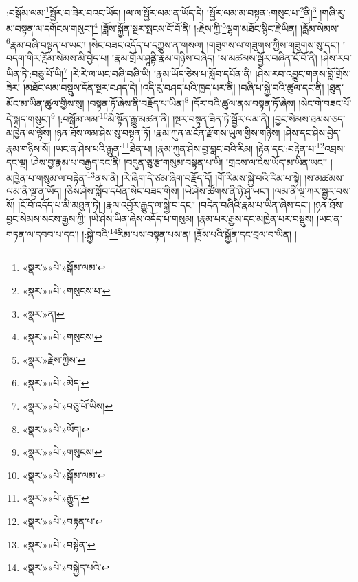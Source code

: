:བསྒོམ་ལམ་\footnote{«སྣར་»«པེ་»སྒོམ་ལམ་}སྦྱོར་བ་ཟེར་བའང་ཡོད། །ལ་ལ་སྦྱོར་ལམ་ན་ཡོད་དེ། །སྦྱོར་ལམ་མ་བསྟན་:གསུང་པ་\footnote{«སྣར་»«པེ་»གསུངས་པ་}ནི།\footnote{«སྣར་»ན།} །གཞི་རུ་མ་བསྟན་ལ་དགོངས་གསུང་།\footnote{«སྣར་»«པེ་»གསུངས།} །ཟློས་སྐྱོན་སྔར་སྤངས་ངོ་བོ་ནི། །:རྗེས་ཀྱི་\footnote{«སྣར་»རྗེས་ཀྱིས་}ལྷག་མཐོང་སྙིང་རྗེ་ཡིན། །རློམ་སེམས་\footnote{«སྣར་»«པེ་»མེད་}རྣམ་བཞི་བསྟན་པ་ཡང་། །སེང་བཟང་འདོད་པ་དཀྱུས་ན་གསལ། །གཟུགས་ལ་གཟུགས་ཀྱིས་གཟུགས་སུ་དང་། །བདག་གིར་རློམ་སེམས་མི་བྱེད་པ། །རྣམ་གྲོལ་ཤཱནྟི་རྣམ་གཉིས་བཞེད། །ས་མཚམས་སྦྱོར་བཞིན་ངོ་བོ་ནི། །ཤེས་རབ་ཡིན་ཏེ་:བཅུ་པོ་ཡི།\footnote{«སྣར་»«པེ་»བཅུ་པོ་ཡིས།} །རེ་རེ་ལ་ཡང་བཞི་བཞི་ཡི། །རྣམ་ཡོད་ཅེས་པ་སློབ་དཔོན་ནི། །ཤེས་རབ་འབྱུང་གནས་བློ་གྲོས་ཟེར། །མཐོང་ལམ་བསྡུས་དོན་སྔར་བཤད་དེ། །འདི་རུ་བཤད་པའི་ཁྱད་པར་ནི། །བཞི་པ་སྐྱེ་བའི་ཚུལ་དང་ནི། །ཐུན་མོང་མ་ཡིན་ཚུལ་གྱིས་སུ། །བསྟན་ཏོ་ཞེས་ནི་བརྗོད་པ་ཡིན།\footnote{«སྣར་»«པེ་»ཡོད།} །དོར་བའི་ཚུལ་ནས་བསྟན་ཏོ་ཞེས། །སེང་གེ་བཟང་པོ་དེ་སྐད་གསུང་།\footnote{«སྣར་»«པེ་»གསུངས།} །:བསྒོམ་ལམ་\footnote{«སྣར་»«པེ་»སྒོམ་ལམ་}མི་སྟོན་རྒྱུ་མཚན་ནི། །སྔར་བསྟན་ཟིན་ཏེ་སྦྱོར་ལམ་ནི། །བྱང་སེམས་ཐམས་ཅད་མཁྱེན་ལ་ལྟོས། །ཉན་ཐོས་ལམ་ཤེས་སུ་བསྟན་ཏོ། །རྣམ་ཀུན་མངོན་རྫོགས་ཡུལ་གྱིས་གཉིས། །ཤེས་དང་ཤེས་བྱེད་རྣམ་གཉིས་སོ། །ཡང་ན་ཤེས་པའི་རྒྱུན་\footnote{«སྣར་»«པེ་»རྒྱུད་}ཐེན་པ། །རྣམ་ཀུན་ཤེས་བྱ་བླང་བའི་རིམ། །རྟེན་དང་:བརྟེན་པ་\footnote{«སྣར་»«པེ་»བརྟན་པ་}འབྲས་དང་ལྔ། །ཤེས་བྱ་རྣམ་པ་བརྒྱད་དང་ནི། །བདུན་ཅུ་རྩ་གསུམ་བསྟན་པ་ཡི། །གྲངས་ལ་ངེས་ཡོད་མ་ཡིན་ཡང་། །མཁྱེན་པ་གསུམ་ལ་བརྟེན་\footnote{«སྣར་»«པེ་»བསྟེན་}ནས་ནི། །རེ་ཞིག་དེ་ཙམ་ཞིག་བརྗོད་དོ། །གོ་རིམས་སྐྱེ་བའི་རིམ་པ་སྟེ། །ས་མཚམས་ལམ་ནི་ལྔ་ན་ཡོད། །ཅིས་ཤེས་སློབ་དཔོན་སེང་བཟང་གིས། །ཡེ་ཤེས་ཚོགས་ནི་ཉི་ཤུ་ཡང་། །ལམ་ནི་ལྔ་ཀར་སྦྱར་བས་སོ། །ངོ་བོ་འདོད་པ་མི་མཐུན་ཏེ། །རྣལ་འབྱོར་རྒྱུད་ལ་སྐྱེ་བ་དང་། །བདེན་བཞིའི་རྣམ་པ་ཡིན་ཞེས་དང་། །ཉན་ཐོས་བྱང་སེམས་སངས་རྒྱས་ཀྱི། །ཡེ་ཤེས་ཡིན་ཞེས་འདོད་པ་གསུམ། །རྣམ་པར་རྒྱས་དང་མཁྱེན་པར་བསྡུས། །ཡང་ན་གཏན་ལ་དབབ་པ་དང་། །:སྐྱེ་བའི་\footnote{«སྣར་»«པེ་»བསྐྱེད་པའི་}རིམ་པས་བསྟན་པས་ན། །ཟློས་པའི་སྐྱོན་དང་བྲལ་བ་ཡིན། །
